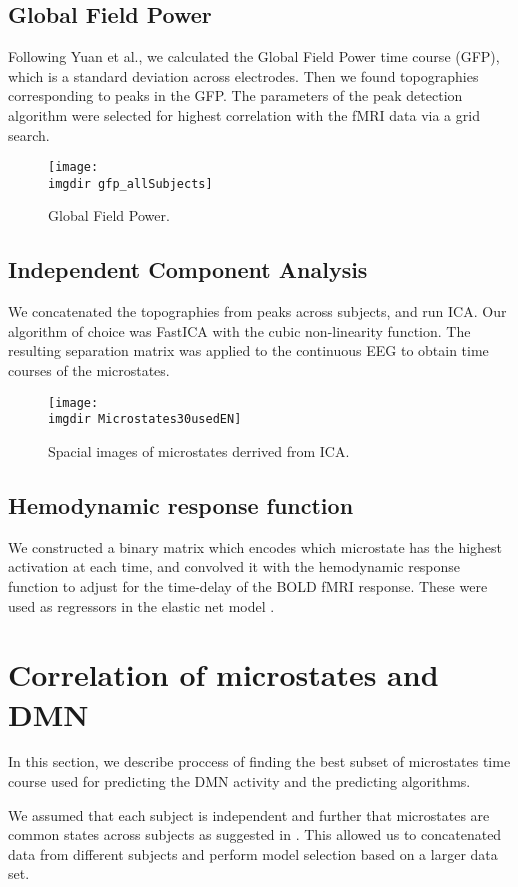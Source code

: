 \documentclass{article}
\newcommand{\imgdir}{Images/} %
\begin{document}
\subsection{Global Field Power}
Following Yuan et al., we calculated the Global Field Power time course (GFP), which is a standard deviation across electrodes. Then we found topographies corresponding to peaks in the GFP. The parameters of the peak detection algorithm were selected for highest correlation with the fMRI data via a grid search.

\begin{figure}[!ht]
    \centering
    \texttt{[image: \\imgdir gfp\_allSubjects]}
    \caption{Global Field Power.}
    \label{fig:gfp}
\end{figure}

\subsection{Independent Component Analysis}
We concatenated the topographies from peaks across subjects, and run ICA. Our algorithm of choice was FastICA \cite{fast_robust} with the cubic non-linearity function. The resulting separation matrix was applied to the continuous EEG to obtain time courses of the microstates.

\begin{figure}[!ht]
    \centering
    \texttt{[image: \\imgdir Microstates30usedEN]}
    \caption{Spacial images of microstates derrived from ICA.}
    \label{fig:microstates}
\end{figure}
\subsection{Hemodynamic response function}   
We constructed a binary matrix which encodes which microstate has the highest activation at each time, and convolved it with the hemodynamic response function to adjust for the time-delay of the BOLD fMRI response. These were used as regressors in the elastic net model \cite{hastie01}. 


\section{Correlation of microstates and DMN}
In this section, we describe proccess of finding the best subset of microstates time course used for predicting the DMN activity and the predicting algorithms.

We assumed that each subject is independent and further that microstates are common states across subjects as suggested in \cite{Yuan20122062}. This allowed us to concatenated data from different subjects and perform model selection based on a larger data set.
\end{document}
